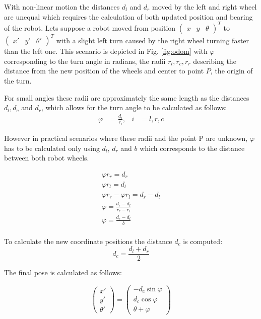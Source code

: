With non-linear motion the distances $d_{l}$ and $d_{r}$ moved by the left and right wheel are unequal which requires the calculation of both updated position and bearing of the robot. 
Lets suppose a robot moved from position $\begin{pmatrix} x & y & \theta \end{pmatrix}^{T}$ to $\begin{pmatrix} x' & y' & \theta' \end{pmatrix}^{T}$ with a slight left turn caused by the right wheel turning faster than the left one. 
This scenario is depicted in Fig. \ref{fig:odom} with $\varphi$ corresponding to the turn angle in radians, the radii $r_{l}, r_{c}, r_{r}$ describing the distance from the new position of the wheels and center to point $P$, the origin of the turn. 

For small angles these radii are approximately the same length as the distances $d_{l}, d_{c}$ and $d_{r}$, which allows for the turn angle to be calculated as follows:
\begin{align*}
	\varphi &= \frac{d_{i}}{r_{i}}, & i &= l, r, c  
\end{align*}

However in practical scenarios where these radii and the point P are unknown, $\varphi$ has to be calculated only using $d_{l}$, $d_{r}$ and $b$ which corresponds to the distance between both robot wheels.

\begin{equation*}
	\begin{split}
		\varphi r_{r} = d_{r} \\
		\varphi r_{l} = d_{l} \\
		\varphi r_{r} - \varphi r_{l} = d_{r} - d_{l} \\
		\varphi = \frac{d_{r} - d_{l}}{r_{r} - r_{l}} \\ 
		\varphi = \frac{d_{r} - d_{l}}{b} \\
	\end{split}
\end{equation*}

To calculate the new coordinate positions the distance $d_{c}$ is computed:
\begin{equation*}
	d_{c} = \frac{d_{l} + d_{r}}{2}
\end{equation*}

The final pose is calculated as follows:

\begin{equation*}
	\begin{pmatrix}
		x' \\ 
		y' \\
		\theta'
	\end{pmatrix}
	= 
	\begin{pmatrix}
		-d_{c} \sin \varphi \\
		d_{c} \cos \varphi \\ 
		\theta + \varphi
	\end{pmatrix}
\end{equation*}

